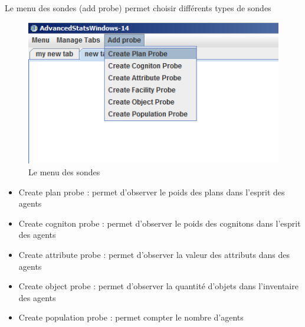 Le menu des sondes (add probe) permet choisir différents types de sondes

\begin{figure}[!ht]
\begin{center}
\includegraphics[scale=0.8]{DocumentationSimulation/images/ADVS_ProbeMenu.png}
\caption[observe]{Le menu des sondes\\}
\label{observe9}
\end{center}
\end{figure} 

\begin{itemize}
\item  Create plan probe : permet d'observer le poids des plans dans l'esprit des agents
\item  Create cogniton probe : permet d'observer le poids des cognitons dans l'esprit des agents
\item  Create attribute probe : permet d'observer la valeur des attributs dans des agents
\item  Create object probe : permet d'observer la quantité d'objets dans l'inventaire des agents
\item  Create population probe : permet compter le nombre d'agents
\end{itemize}

